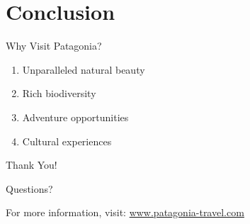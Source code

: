\documentclass[aspectratio=169]{beamer}
\begin{document}
\section{Conclusion}

\begin{frame}{Why Visit Patagonia?}
    \begin{enumerate}
        \item Unparalleled natural beauty
        \item Rich biodiversity
        \item Adventure opportunities
        \item Cultural experiences
    \end{enumerate}
\end{frame}

\begin{frame}{Thank You!}
    \begin{center}
        \Huge{Questions?}
        
        \vspace{1cm}
        
        \normalsize{For more information, visit:}
        \url{www.patagonia-travel.com}
    \end{center}
\end{frame}
\end{document}
